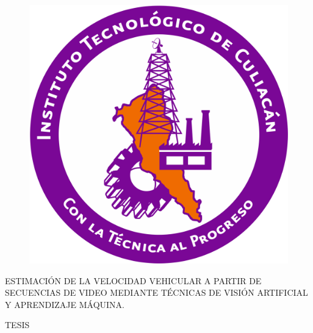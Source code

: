 \begin{titlepage}

    \begin{center}
        
        \vspace*{-0.15cm}
    
        
        \vspace{0.25cm}
        
        \begin{figure}[H]
            \centering
            \includegraphics[scale=0.25]{Portada/logotec.png}
        \end{figure}
        
        \vspace{0.3cm}
        \large{ESTIMACIÓN DE LA VELOCIDAD VEHICULAR A PARTIR DE SECUENCIAS DE VIDEO MEDIANTE TÉCNICAS DE VISIÓN ARTIFICIAL Y APRENDIZAJE MÁQUINA.}
        
        \vspace{0.5cm}
        
        \large{TESIS}
        

\end{center}
\end{titlepage}
